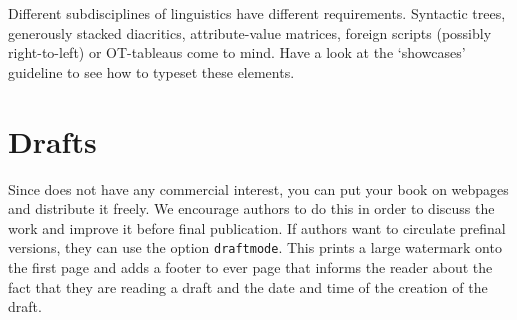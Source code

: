 Different subdisciplines of linguistics have different requirements. Syntactic trees, generously stacked diacritics, attribute-value matrices, foreign scripts (possibly right-to-left) or OT-tableaus come to mind. Have a look at the `showcases' guideline to see how to typeset these elements.


 
   
\section{Drafts}

Since \lsp does not have any commercial interest, you can put your book on webpages and distribute it
freely. We encourage authors to do this in order to discuss the work and improve it before final
publication. If authors want to circulate prefinal versions, they can use the option
\texttt{draftmode}. This prints a large watermark onto the first page and adds a footer to ever page
that informs the reader about the fact that they are reading a draft and the date and time of the
creation of the draft.
  